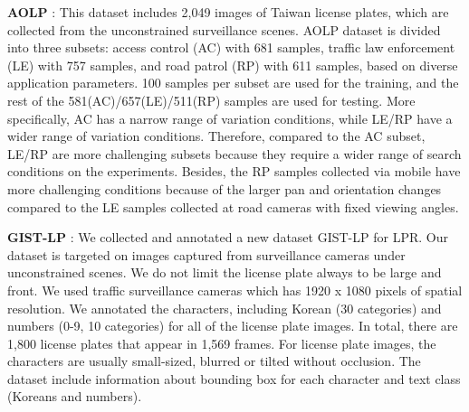 \documentclass[a4paper,twoside]{article}
\begin{document}
    \textbf{AOLP} : This dataset\cite{hsu2013application} includes 2,049 images of Taiwan license plates, which are collected from the unconstrained surveillance scenes. AOLP dataset is divided into three subsets: access control (AC) with 681 samples, traffic law enforcement (LE) with 757 samples, and road patrol (RP) with 611 samples, based on diverse application parameters. 100 samples per subset are used for the training, and the rest of the 581(AC)/657(LE)/511(RP) samples are used for testing. More specifically, AC has a narrow range of variation conditions, while LE/RP have a wider range of variation conditions. Therefore, compared to the AC subset, LE/RP are more challenging subsets because they require a wider range of search conditions on the experiments. Besides, the RP samples collected via mobile have more challenging conditions because of the larger pan and orientation changes compared to the LE samples collected at road cameras with fixed viewing angles. 
  
    \textbf{GIST-LP} : We collected and annotated a new dataset GIST-LP for LPR. Our dataset is targeted on images captured from surveillance cameras under unconstrained scenes. We do not limit the license plate always to be large and front. We used traffic surveillance cameras which has 1920 x 1080 pixels of spatial resolution. We annotated the characters, including Korean (30 categories) and numbers (0-9, 10 categories) for all of the license plate images. In total, there are 1,800 license plates that appear in 1,569 frames. For license plate images, the characters are usually small-sized, blurred or tilted without occlusion. The dataset include information about bounding box for each character and text class (Koreans and numbers).
\end{document}
